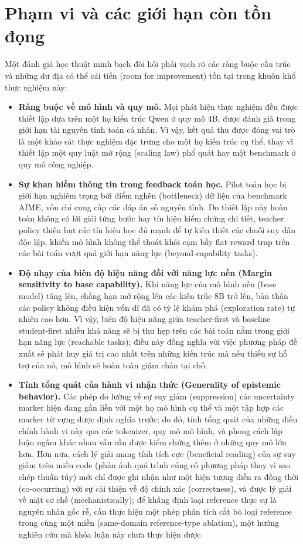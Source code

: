 \section{Phạm vi và các giới hạn còn tồn đọng}\label{scope-and-remaining-limitations}

Một đánh giá học thuật minh bạch đòi hỏi phải vạch rõ các ràng buộc cấu trúc và những dư địa có thể cải tiến (room for improvement) tồn tại trong khuôn khổ thực nghiệm này:

\begin{itemize}
\tightlist
\item
  \textbf{Ràng buộc về mô hình và quy mô.} Mọi phát hiện thực nghiệm đều được thiết lập dựa trên một họ kiến trúc Qwen ở quy mô 4B, được đánh giá trong giới hạn tài nguyên tính toán cá nhân. Vì vậy, kết quả thu được đóng vai trò là một khảo sát thực nghiệm đặc trưng cho một họ kiến trúc cụ thể, thay vì thiết lập một quy luật mở rộng (scaling law) phổ quát hay một benchmark ở quy mô công nghiệp.
\item
  \textbf{Sự khan hiếm thông tin trong feedback toán học.} Pilot toán học bị giới hạn nghiêm trọng bởi điểm nghẽn (bottleneck) dữ liệu của benchmark AIME, vốn chỉ cung cấp các đáp án số nguyên tĩnh. Do thiết lập này hoàn toàn không có lời giải từng bước hay tín hiệu kiểm chứng chi tiết, teacher policy thiếu hụt các tín hiệu học đủ mạnh để tự kiến thiết các chuỗi suy dẫn độc lập, khiến mô hình không thể thoát khỏi cạm bẫy flat-reward trap trên các bài toán vượt quá giới hạn năng lực (beyond-capability tasks).
\item
  \textbf{Độ nhạy của biên độ hiệu năng đối với năng lực nền (Margin sensitivity to base capability).} Khi năng lực của mô hình nền (base model) tăng lên, chẳng hạn mở rộng lên các kiến trúc 8B trở lên, bản thân các policy không điều kiện vốn dĩ đã có tỷ lệ khám phá (exploration rate) tự nhiên cao hơn. Vì vậy, biên độ hiệu năng giữa teacher-first và baseline student-first nhiều khả năng sẽ bị thu hẹp trên các bài toán nằm trong giới hạn năng lực (reachable tasks); điều này đồng nghĩa với việc phương pháp đề xuất sẽ phát huy giá trị cao nhất trên những kiến trúc mà nếu thiếu sự hỗ trợ của nó, mô hình sẽ hoàn toàn giậm chân tại chỗ.
\item
  \textbf{Tính tổng quát của hành vi nhận thức (Generality of epistemic behavior).} Các phép đo lường về sự suy giảm (suppression) các uncertainty marker hiện đang gắn liền với một họ mô hình cụ thể và một tập hợp các marker từ vựng được định nghĩa trước; do đó, tính tổng quát của những điều chỉnh hành vi này qua các tokenizer, quy mô mô hình, và phong cách lập luận ngầm khác nhau vẫn cần được kiểm chứng thêm ở những quy mô lớn hơn. Hơn nữa, cách lý giải mang tính tích cực (beneficial reading) của sự suy giảm trên miền code (phản ánh quá trình củng cố phương pháp thay vì sao chép thuần túy) mới chỉ được ghi nhận như một hiện tượng diễn ra đồng thời (co-occurring) với sự cải thiện về độ chính xác (correctness), và được lý giải về mặt cơ chế (mechanistically); để khẳng định loại reference thực sự là nguyên nhân gốc rễ, cần thực hiện một phép phân tích cắt bỏ loại reference trong cùng một miền (same-domain reference-type ablation), một hướng nghiên cứu mà khóa luận này chưa thực hiện được.
\end{itemize}
